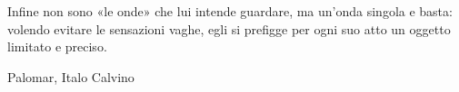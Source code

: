 
\cleardoublepage

\thispagestyle{empty}

\begin{flushright}
\begin{minipage}{.4\textwidth}
  Infine non sono «le onde» che lui intende guardare, ma un'onda singola
  e basta: volendo evitare le sensazioni vaghe, egli si prefigge per
  ogni suo atto un oggetto limitato e preciso.
\end{minipage}

Palomar, Italo Calvino
\end{flushright}

\cleardoublepage

